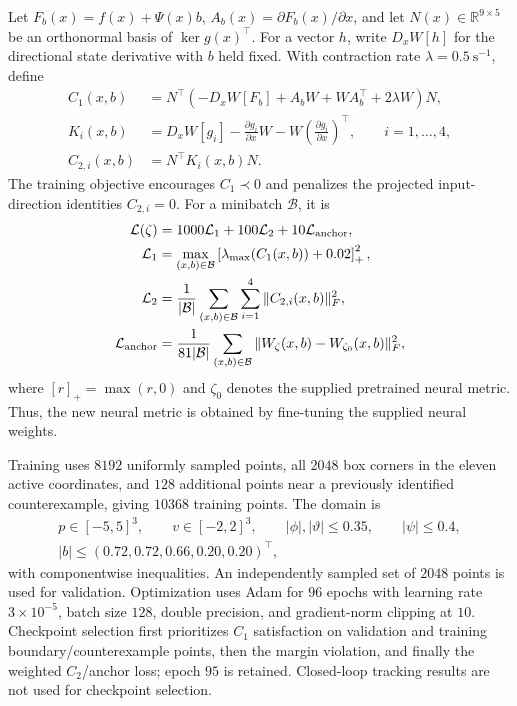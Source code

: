 \documentclass[11pt]{article}
\begin{document}
Let $F_b(x)=f(x)+\Psi(x)b$,
$A_b(x)=\partial F_b(x)/\partial x$, and let
$N(x)\in\mathbb R^{9\times5}$ be an orthonormal basis of
$\ker g(x)^\top$. For a vector $h$, write $D_xW[h]$ for the
directional state derivative with $b$ held fixed.
With contraction rate $\lambda=0.5~\mathrm{s^{-1}}$, define
\begin{align}
    C_1(x,b)&=N^\top\left(-D_xW[F_b]+A_bW+WA_b^\top
        +2\lambda W\right)N,\label{eq:quad-c1}\\
    K_i(x,b)&=D_xW[g_i]-\frac{\partial g_i}{\partial x}W
        -W\left(\frac{\partial g_i}{\partial x}\right)^\top,
        \qquad i=1,\ldots,4,\\
    C_{2,i}(x,b)&=N^\top K_i(x,b)N.\label{eq:quad-c2}
\end{align}
The training objective encourages $C_1\prec0$ and penalizes the
projected input-direction identities $C_{2,i}=0$.
For a minibatch $\mathcal B$, it is
\begin{align}
    \mathcal L(\zeta)&=1000\mathcal L_1+100\mathcal L_2
        +10\mathcal L_{\rm anchor},\\
    \mathcal L_1&=\max_{(x,b)\in\mathcal B}
        \left[\lambda_{\max}(C_1(x,b))+0.02\right]_+^2,\\
    \mathcal L_2&=\frac{1}{|\mathcal B|}
        \sum_{(x,b)\in\mathcal B}\sum_{i=1}^{4}
        \|C_{2,i}(x,b)\|_F^2,\\
    \mathcal L_{\rm anchor}&=\frac{1}{81|\mathcal B|}
        \sum_{(x,b)\in\mathcal B}
        \|W_\zeta(x,b)-W_{\zeta_0}(x,b)\|_F^2,
\end{align}
where $[r]_+=\max(r,0)$ and $\zeta_0$ denotes the supplied pretrained
neural metric. Thus, the new neural metric is obtained by fine-tuning
the supplied neural weights.

Training uses $8192$ uniformly sampled points, all $2048$ box corners
in the eleven active coordinates, and $128$
additional points near a previously identified counterexample, giving
$10368$ training points. The domain is
\begin{equation}
\begin{gathered}
    p\in[-5,5]^3,\qquad v\in[-2,2]^3,\qquad
    |\phi|,|\vartheta|\le0.35,\qquad |\psi|\le0.4,\\
    |b|\le(0.72,0.72,0.66,0.20,0.20)^\top,
\end{gathered}
\end{equation}
with componentwise inequalities. An independently sampled set of
$2048$ points is used for validation. Optimization uses Adam for
$96$ epochs with learning rate $3\times10^{-5}$, batch size $128$,
double precision, and gradient-norm clipping at $10$.
Checkpoint selection first prioritizes $C_1$ satisfaction on validation
and training boundary/counterexample points, then the margin violation,
and finally the weighted $C_2$/anchor loss; epoch $95$ is retained.
Closed-loop tracking results are not used for checkpoint selection.
\end{document}
